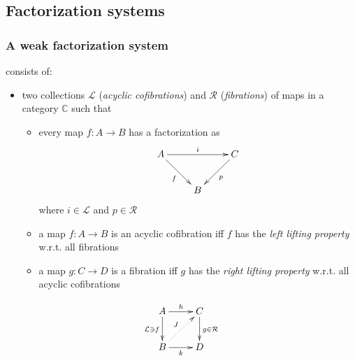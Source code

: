 \documentclass[dvipdfmx]{beamer}
\begin{document}

\subsection{Factorization systems}

\begin{frame}
  \frametitle{A weak factorization system
  \nocite{warren2008homotopy}}
  consists of:
  \begin{itemize}
    \item two collections ${\mathcal L}$ ({\it acyclic cofibrations})
      and ${\mathcal R}$ ({\it fibrations})
      of maps in a category ${\mathbb C}$
      such that
      \begin{itemize}
        \item every map $f : A \to B$ has a factorization as
          \[
            \xymatrix{
              A \ar[rr]^{i} \ar[dr]_{f}
              &
              & C \ar[dl]^{p}
              \\
              & B
              &
            }
          \]
          where $i \in {\mathcal L}$ and $p \in {\mathcal R}$
        \item a map $f : A \to B$ is an acyclic cofibration iff
          $f$ has the {\it left lifting property} w.r.t.
          all fibrations
        \item a map $g : C \to D$ is a fibration iff
          $g$ has the {\it right lifting property} w.r.t.
          all acyclic cofibrations
      \end{itemize}
  \end{itemize}
  \[
    \xymatrix{
      A \ar[r]^{h} \ar[d]_{ {\mathcal L} \ni f}
      & C \ar[d]^{g \in {\mathcal R}}
      \\
      B \ar[r]_{k} \ar@{.>}[ur]^{J}
      & D
    }
  \]
\end{frame}
\end{document}
